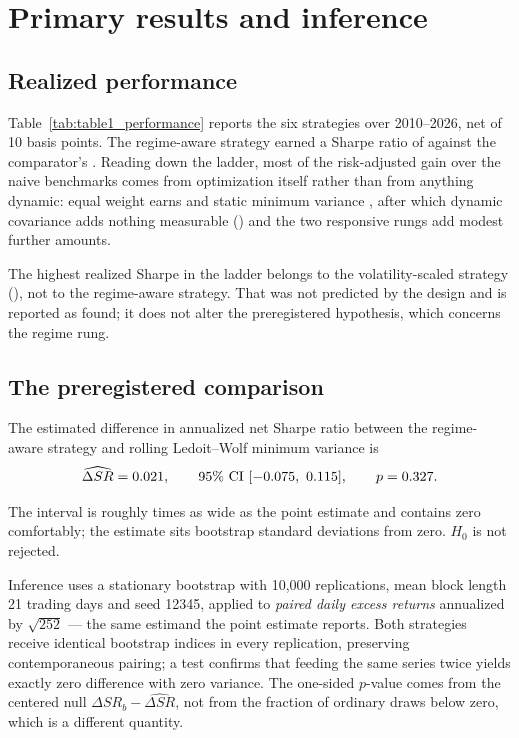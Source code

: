 \section{Primary results and inference}
\label{sec:results}

\subsection{Realized performance}

Table~\ref{tab:table1_performance} reports the six strategies over
2010--2026, net of 10 basis points. The regime-aware strategy earned a
Sharpe ratio of \regimeSharpe{} against the comparator's
\comparatorSharpe{}. Reading down the ladder, most of the risk-adjusted
gain over the naive benchmarks comes from optimization itself rather
than from anything dynamic: equal weight earns \equalWeightSharpe{} and
static minimum variance \staticMinvarSharpe{}, after which dynamic
covariance adds nothing measurable (\comparatorSharpe{}) and the two
responsive rungs add modest further amounts.

The highest realized Sharpe in the ladder belongs to the
volatility-scaled strategy (\ewmaScaledSharpe{}), not to the regime-aware strategy.
That was not predicted by the design and is reported as found; it does
not alter the preregistered hypothesis, which concerns the regime rung.



\subsection{The preregistered comparison}

The estimated difference in annualized net Sharpe ratio between the
regime-aware strategy and rolling Ledoit--Wolf minimum variance is
\begin{equation}
\widehat{\Delta SR} = 0.021, \qquad
\text{95\% CI } [-0.075,\ 0.115], \qquad
p = 0.327 .
\end{equation}

The interval is roughly \ciWidthMultiple{} times as wide as the point
estimate and contains zero comfortably; the estimate sits
\primarySdsFromZero{} bootstrap standard deviations from zero. $H_0$ is
not rejected.

Inference uses a stationary bootstrap with 10{,}000 replications, mean
block length 21 trading days and seed 12345, applied to \emph{paired
daily excess returns} annualized by $\sqrt{252}$ --- the same estimand
the point estimate reports. Both strategies receive identical bootstrap
indices in every replication, preserving contemporaneous pairing; a test
confirms that feeding the same series twice yields exactly zero
difference with zero variance. The one-sided $p$-value comes from the
centered null $\Delta SR_b - \widehat{\Delta SR}$, not from the fraction
of ordinary draws below zero, which is a different quantity.

